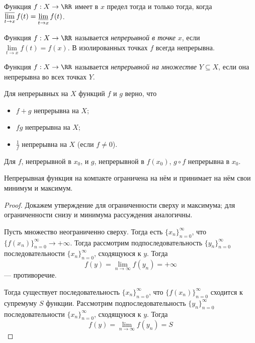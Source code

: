 \documentclass[12pt,a4paper]{article}
\begin{document}
    \begin{statement}
        Функция $f: X \to \RR$ имеет в $x$ предел тогда и только тогда, когда $\varlimsup\limits_{t \to x} f(t) = \varliminf\limits_{t \to x} f(t)$.
    \end{statement}

    \begin{definition}
        Функция $f: X \to \RR$ называется \emph{непрерывной в точке} $x$, если $\lim\limits_{t \to x} f(t) = f(x)$. В изолированных точках $f$ всегда непрерывна.
    \end{definition}

    \begin{definition}
        Функция $f: X \to \RR$ называется \emph{непрерывной на множестве} $Y \subseteq X$, если она непрерывна во всех точках $Y$.
    \end{definition}

    \begin{statement}
        Для непрерывных на $X$ функций $f$ и $g$ верно, что
        \begin{itemize}
            \item $f+g$ непрерывна на $X$;
            \item $fg$ непрерывна на $X$;
            \item $\frac{1}{f}$ непрерывна на $X$ (если $f \neq 0$).
        \end{itemize}
    \end{statement}

    \begin{statement}
        Для $f$, непрерывной в $x_0$, и $g$, непрерывной в $f(x_0)$, $g\circ f$ непрерывна в $x_0$.
    \end{statement}

    \begin{theorem}[Вейерштрасса]
        Непрерывная функция на компакте ограничена на нём и принимает на нём свои минимум и максимум.
    \end{theorem}

    \begin{proof}
        Докажем утверждение для ограниченности сверху и максимума; для ограниченности снизу и минимума рассуждения аналогичны.

        Пусть множество неограниченно сверху. Тогда есть $\{x_n\}_{n=0}^\infty$, что $\{f(x_n)\}_{n=0}^\infty \to +\infty$. Тогда рассмотрим подпоследовательность $\{y_n\}_{n=0}^\infty$ последовательности $\{x_n\}_{n=0}^\infty$, сходящуюся к $y$. Тогда
        \[f(y) = \lim_{n \to \infty}\limits f(y_n) = +\infty\]
        --- противоречие.

        Тогда существует последовательность $\{x_n\}_{n=0}^\infty$, что $\{f(x_n)\}_{n=0}^\infty$ сходится к супремуму $S$ функции. Рассмотрим подпоследовательность $\{y_n\}_{n=0}^\infty$ последовательности $\{x_n\}_{n=0}^\infty$, сходящуюся к $y$. Тогда
        \[f(y) = \lim_{n \to \infty} f(y_n) = S\]
    \end{proof}
\end{document}
